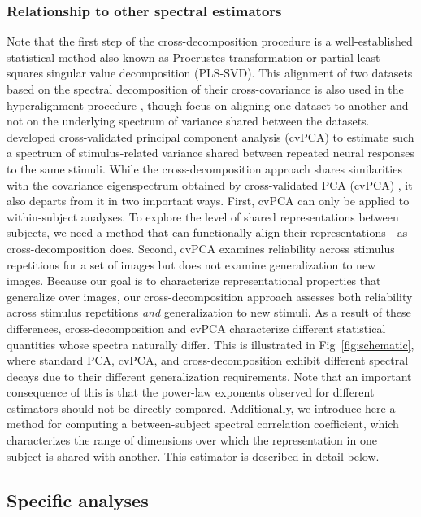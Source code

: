 \documentclass[10pt]{article}
\begin{document}
\subsubsection{Relationship to other spectral estimators}\label{sec:comparison-with-other-estimators}

Note that the first step of the cross-decomposition procedure is a well-established statistical method also known as Procrustes transformation or partial least squares singular value decomposition (PLS-SVD). This alignment of two datasets based on the spectral decomposition of their cross-covariance is also used in the hyperalignment procedure \autocite{Haxby2011}, though \textcite{Haxby2011} focus on aligning one dataset to another and not on the underlying spectrum of variance shared between the datasets. \textcite{Stringer2019} developed cross-validated principal component analysis (cvPCA) to estimate such a spectrum of stimulus-related variance shared between repeated neural responses to the same stimuli. While the cross-decomposition approach shares similarities with the covariance eigenspectrum obtained by cross-validated PCA (cvPCA) \autocite{Stringer2019}, it also departs from it in two important ways. First, cvPCA can only be applied to within-subject analyses. To explore the level of shared representations between subjects, we need a method that can functionally align their representations---as cross-decomposition does. Second, cvPCA examines reliability across stimulus repetitions for a set of images but does not examine generalization to new images. Because our goal is to characterize representational properties that generalize over images, our cross-decomposition approach assesses both reliability across stimulus repetitions \emph{and} generalization to new stimuli. As a result of these differences, cross-decomposition and cvPCA characterize different statistical quantities whose spectra naturally differ. This is illustrated in Fig~\ref{fig:schematic}, where standard PCA, cvPCA, and cross-decomposition exhibit different spectral decays due to their different generalization requirements. Note that an important consequence of this is that the power-law exponents observed for different estimators should not be directly compared. Additionally, we introduce here a method for computing a between-subject spectral correlation coefficient, which characterizes the range of dimensions over which the representation in one subject is shared with another. This estimator is described in detail below.

\subsection{Specific analyses}\label{specific-analyses}
\end{document}

